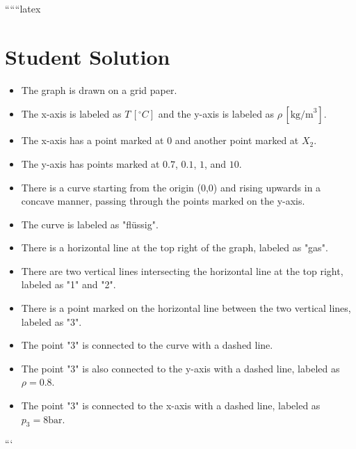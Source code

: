 
``````latex


\section*{Student Solution}

\begin{itemize}
    \item The graph is drawn on a grid paper.
    \item The x-axis is labeled as \( T \, [^\circ C] \) and the y-axis is labeled as \( \rho \, [\text{kg/m}^3] \).
    \item The x-axis has a point marked at \( 0 \) and another point marked at \( X_2 \).
    \item The y-axis has points marked at \( 0.7 \), \( 0.1 \), \( 1 \), and \( 10 \).
    \item There is a curve starting from the origin (0,0) and rising upwards in a concave manner, passing through the points marked on the y-axis.
    \item The curve is labeled as "flüssig".
    \item There is a horizontal line at the top right of the graph, labeled as "gas".
    \item There are two vertical lines intersecting the horizontal line at the top right, labeled as "1" and "2".
    \item There is a point marked on the horizontal line between the two vertical lines, labeled as "3".
    \item The point "3" is connected to the curve with a dashed line.
    \item The point "3" is also connected to the y-axis with a dashed line, labeled as \( \rho = 0.8 \).
    \item The point "3" is connected to the x-axis with a dashed line, labeled as \( p_3 = 8 \text{bar} \).
\end{itemize}

```